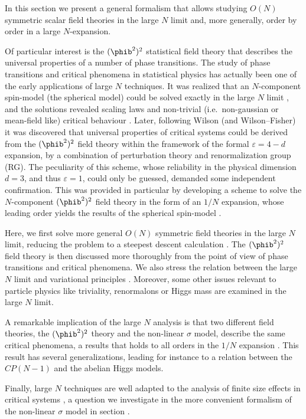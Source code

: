 In this section we present a general formalism that allows
studying $O(N)$ symmetric scalar field theories in the large $N$
limit and, more generally, order by order in a large $ N
$-expansion. \par Of particular interest is the $(\phib^2)^2$
statistical field theory that describes the universal properties
of a number of phase transitions. The  study of phase transitions
and critical phenomena in statistical physics has actually been
one of the early applications of large $N$ techniques. It was
realized that an $N$-component spin-model (the spherical model)
could be solved exactly in the large $N$ limit
, and the solutions revealed scaling laws
and non-trivial (i.e.~non-gaussian or mean-field like) critical
behaviour . Later, following Wilson (and Wilson--Fisher)
 it was discovered that universal
properties of critical systems  could be derived  from the
$(\phib^2)^2$ field theory within the framework of the formal $
\varepsilon =4-d$ expansion, by a combination of perturbation
theory and renormalization group (RG). The peculiarity of this
scheme, whose reliability in the physical dimension $d=3$, and
thus $\varepsilon=1$, could only be guessed, demanded some
independent confirmation. This was provided in particular by
developing a scheme to solve the $N$-component $(\phib^2)^2$ field
theory in the form of an $1/N$ expansion, whose leading order
yields the results of the spherical spin-model
. \sslbl\scfivN
\par
Here, we first solve more general $O(N)$ symmetric field theories
in the large $N$ limit, reducing the problem to a steepest descent
calculation . The $( \phib^2)^2$ field
theory is then discussed more thoroughly from the point of view of
phase transitions and critical phenomena. We also stress the
relation between the large $N$ limit and  variational principles
. Moreover, some other issues relevant to particle
physics like triviality, renormalons or Higgs mass are examined in
the large $N$ limit. \par A remarkable implication of the large
$N$ analysis is that two different field theories, the
$(\phib^2)^2$ theory and the non-linear $\sigma $ model, describe
the same critical phenomena, a results that holds to all orders in
the $1/N$ expansion . This result has
several generalizations, leading for instance to a relation
between the $CP(N-1)$   and the abelian
Higgs models.
\par Finally, large $N$ techniques are well adapted to the
analysis of finite size effects in critical systems \rBrCaPe, a
question we investigate in the more convenient formalism of the
non-linear $\sigma $ model in section \label{\ssNFSS}.

